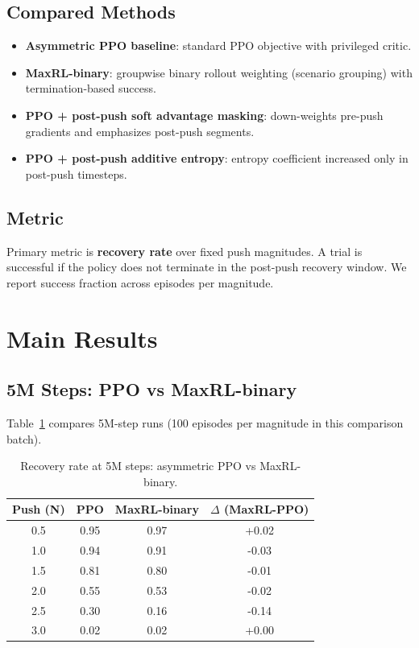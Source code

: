\documentclass[letterpaper, 10 pt, conference]{ieeeconf}
\begin{document}
\subsection{Compared Methods}
\begin{itemize}
  \item \textbf{Asymmetric PPO baseline}: standard PPO objective with privileged critic.
  \item \textbf{MaxRL-binary}: groupwise binary rollout weighting (scenario grouping) with termination-based success.
  \item \textbf{PPO + post-push soft advantage masking}: down-weights pre-push gradients and emphasizes post-push segments.
  \item \textbf{PPO + post-push additive entropy}: entropy coefficient increased only in post-push timesteps.
\end{itemize}

\subsection{Metric}
Primary metric is \textbf{recovery rate} over fixed push magnitudes. A trial is successful if the policy does not terminate in the post-push recovery window. We report success fraction across episodes per magnitude.

\section{Main Results}
\subsection{5M Steps: PPO vs MaxRL-binary}
Table~\ref{tab:ppo_vs_maxrl_5m} compares 5M-step runs (100 episodes per magnitude in this comparison batch).

\begin{table}[t]
\centering
\caption{Recovery rate at 5M steps: asymmetric PPO vs MaxRL-binary.}
\label{tab:ppo_vs_maxrl_5m}
\begin{tabular}{cccc}
\toprule
Push (N) & PPO & MaxRL-binary & $\Delta$ (MaxRL-PPO) \\
\midrule
0.5 & 0.95 & 0.97 & +0.02 \\
1.0 & 0.94 & 0.91 & -0.03 \\
1.5 & 0.81 & 0.80 & -0.01 \\
2.0 & 0.55 & 0.53 & -0.02 \\
2.5 & 0.30 & 0.16 & -0.14 \\
3.0 & 0.02 & 0.02 & +0.00 \\
\bottomrule
\end{tabular}
\end{table}
\end{document}
